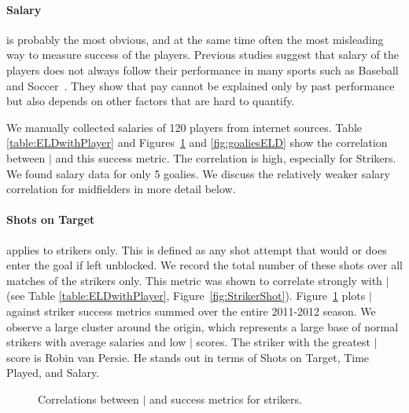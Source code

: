 {	\paragraph{Salary} is probably the most obvious, and at the same time often the most misleading way to measure success of the players. Previous studies suggest that salary of the players does not  always follow their performance in many sports such as Baseball and Soccer~\citep{Hall2002,Barrio2004}. They show that pay cannot be explained only by past performance but also depends on other factors that are hard to quantify. 
	
	 We manually collected salaries of 120 players from internet sources. Table \ref{table:ELDwithPlayer}  and Figures~\ref{fig:strikersELD} and \ref{fig:goaliesELD} show the correlation between $\mid$ and this success metric. The correlation is high, especially for Strikers. We found salary data for only 5 goalies. We discuss the relatively weaker salary correlation for midfielders in more detail below.
	 
	 \paragraph{Shots on Target} applies to strikers only. This is defined as any shot attempt that would or does enter the goal if left unblocked. We record the total number of these shots over all matches of the strikers only. This metric was shown to correlate strongly with $\mid$ (see Table \ref{table:ELDwithPlayer}, Figure~\ref{fig:StrikerShot}).
	 Figure~\ref{fig:strikersELD} plots $\mid$ against striker success metrics summed over the entire 2011-2012 season. We observe a large cluster around the origin, which represents a large base of normal strikers with average salaries and low $\mid$ scores. The striker with the greatest $\mid$ score is Robin van Persie. He stands out in terms of Shots on Target, Time Played, and Salary. 
	 


	\begin{figure}
		\centering     %
		\caption{Correlations between $\mid$ and success metrics for strikers\label{fig:strikersELD}.}
	\end{figure}


}
